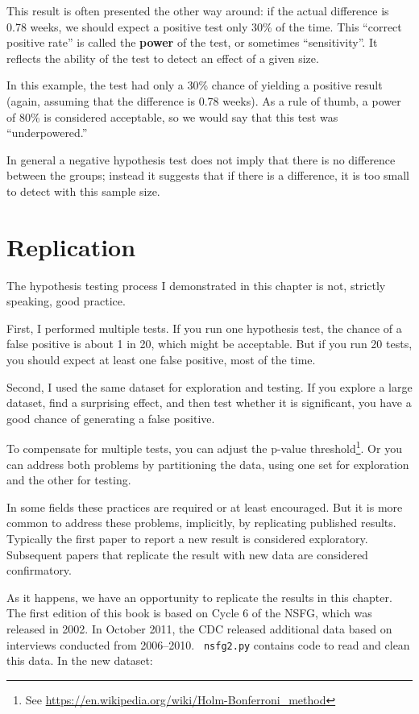 \documentclass[12pt]{book}
\begin{document}
This result is often presented the other way around: if the actual
difference is 0.78 weeks, we should expect a positive test only 30\%
of the time.  This ``correct positive rate'' is called the {\bf power}
of the test, or sometimes ``sensitivity''.  It reflects the ability of
the test to detect an effect of a given size.

In this example, the test had only a 30\% chance of yielding a
positive result (again, assuming that the difference is 0.78 weeks).
As a rule of thumb, a power of 80\% is considered acceptable, so
we would say that this test was ``underpowered.''

In general a negative hypothesis test does not imply that there is no
difference between the groups; instead it suggests that if there is a
difference, it is too small to detect with this sample size.


\section{Replication}

The hypothesis testing process I demonstrated in this chapter is not,
strictly speaking, good practice.

First, I performed multiple tests.  If you run one hypothesis test,
the chance of a false positive is about 1 in 20, which might be
acceptable.  But if you run 20 tests, you should expect at least one
false positive, most of the time.

Second, I used the same dataset for exploration and testing.  If
you explore a large dataset, find a surprising effect, and then test
whether it is significant, you have a good chance of generating a
false positive.

To compensate for multiple tests, you can adjust the p-value
threshold\footnote{See
  \url{https://en.wikipedia.org/wiki/Holm-Bonferroni_method}}.  Or you
can address both problems by partitioning the data, using one set for
exploration and the other for testing.

In some fields these practices are required or at least encouraged.
But it is more common to address these problems, implicitly, by
replicating published results.  Typically the first paper to report a
new result is considered exploratory.  Subsequent papers that
replicate the result with new data are considered confirmatory.

As it happens, we have an opportunity to replicate the results in this
chapter.  The first edition of this book is based on Cycle 6 of the
NSFG, which was released in 2002.  In October 2011, the CDC released
additional data based on interviews conducted from 2006--2010.  {\tt
  nsfg2.py} contains code to read and clean this data.  In the new
dataset:
\end{document}
